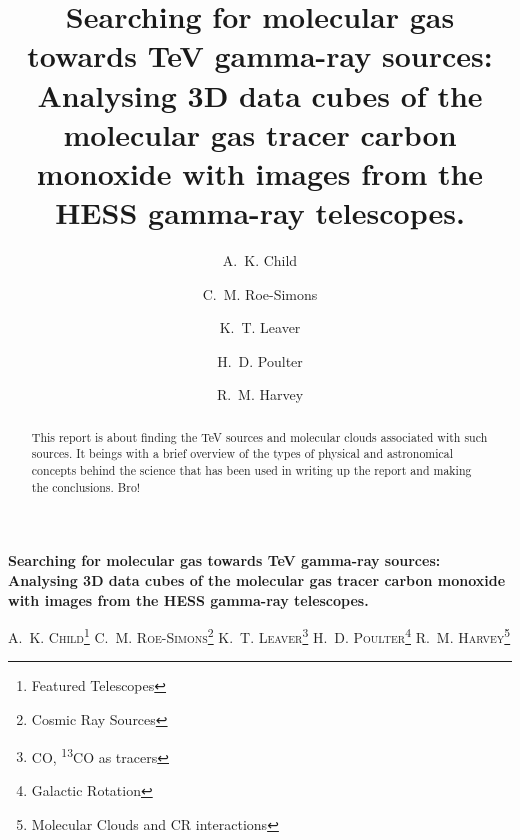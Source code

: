 \documentclass[a4paper, titlepage, oneside]{article}
\newcommand{\elem}[2]{\textsuperscript{#1}{#2}}
\begin{document}
\title{\textbf{Searching for molecular gas towards TeV gamma-ray sources: Analysing 3D data cubes of the molecular gas tracer carbon monoxide with images from the HESS gamma-ray telescopes.}}
\author{A.~K. Child \and C.~M. Roe-Simons \and K.~T. Leaver \and H.~D. Poulter \and R.~M. Harvey}
\maketitle
\date{} %

\setcounter{page}{1}

\tableofcontents

\clearpage
\setcounter{page}{1}

\begin{center}
{\LARGE \textbf{Searching for molecular gas towards TeV gamma-ray sources: Analysing 3D data cubes of the molecular gas tracer carbon monoxide with images from the HESS gamma-ray telescopes.}}

\vspace{1.5em}

\textsc{A.~K. Child\footnote{Featured Telescopes} \quad C.~M. Roe-Simons\footnote{Cosmic Ray Sources} \quad K.~T. Leaver\footnote{CO, \elem{13}{CO} as tracers} \quad H.~D. Poulter\footnote{Galactic Rotation} \quad R.~M. Harvey\footnote{Molecular Clouds and CR interactions}}
\end{center}

\vspace{2em}

\begin{minipage}{0.93\textwidth}
\begin{abstract}
This report is about finding the TeV sources and molecular clouds associated with such sources. It beings with a brief overview of the types of physical and astronomical concepts behind the science that has been used in writing up the report and making the conclusions. Bro!
\end{abstract}
\end{minipage}

\vspace{2.5em}
\end{document}
